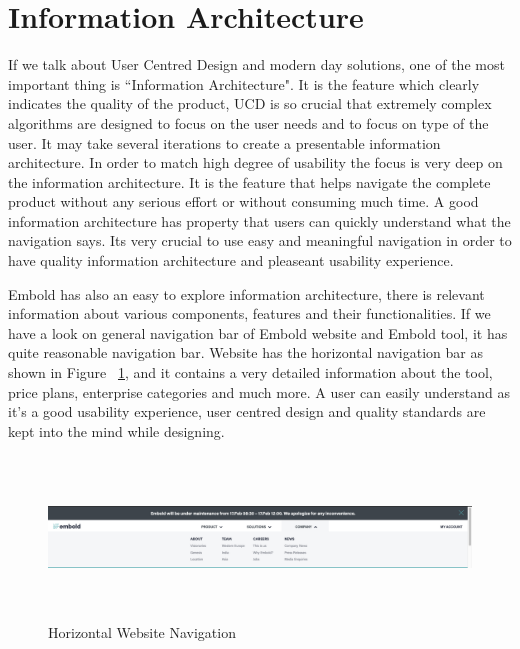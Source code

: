\section{Information Architecture}
If we talk about User Centred Design and modern day solutions, one of the most important thing is ``Information Architecture". It is the feature which clearly indicates the quality of the product, UCD is so crucial that extremely complex algorithms are designed to focus on the user needs and to focus on type of the user. It may take several iterations to create a presentable information architecture. In order to match high degree of usability the focus is very deep on the information architecture. It is the feature that helps navigate the complete product without any serious effort or without consuming much time. A good information architecture has property that users can quickly understand what the navigation says. Its very crucial to use easy and meaningful navigation in order to have quality information architecture and pleaseant usability experience. ~\cite{informationIA}\par
Embold has also an easy to explore information architecture, there is relevant information about various components, features and their functionalities.  If    we have a look on general navigation bar of Embold website and Embold tool, it has quite reasonable navigation bar. Website has the horizontal navigation bar as shown in Figure ~\ref{fig:horizontal}, and it contains a very detailed information about the tool, price plans, enterprise categories and much more. A user can easily understand as it's a good usability experience, user centred design and quality standards are kept into the mind while designing.\par
\begin{figure}[htbp]
\begin{center}
\includegraphics[width=6.5 in, height=1.7in]{Horizontal.png}
\caption{Horizontal Website Navigation ~\cite{emboldio}}
\label{fig:horizontal}
\end{center}
\end{figure}


